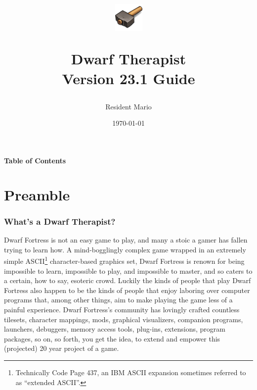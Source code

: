 \documentclass[]{article}
\begin{document}

\title{ \begin{figure}[h!] \centering \includegraphics[scale=.8]{logo}
\end{figure}
\textbf{Dwarf Therapist}\\Version 23.1 Guide}
\author{Resident Mario}
\date{\today}
\maketitle

\newpage
{}
\begin{center}
\textbf{Table of Contents}
\end{center}
\tableofcontents
\newpage

\part{Preamble}
\section{What's a Dwarf Therapist?}

Dwarf Fortress is not an easy game to play, and many a stoic a gamer has fallen trying to learn how. A
mind-bogglingly complex game wrapped in an extremely simple ASCII\footnote{Technically Code Page 437, an
IBM ASCII expansion sometimes referred to as ``extended ASCII''.} character-based graphics set, Dwarf
Fortress is renown for being impossible to learn, impossible to play, and impossible to master, and so
caters to a certain, how to say, esoteric crowd.
Luckily the kinds of people that play Dwarf Fortress also happen to be the kinds of people that enjoy
laboring over computer programs that, among other things, aim to make playing the game less of a painful
experience. Dwarf Fortress's community has lovingly crafted countless tilesets, character
mappings, mods, graphical visualizers, companion programs, launchers, debuggers, memory access tools,
plug-ins, extensions, program packages, so on, so forth, you get the idea, to extend and empower this
(projected) 20 year project of a game.
\end{document}
